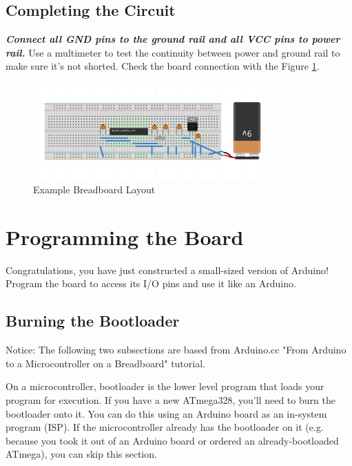 \documentclass{article}
\begin{document}
\subsection{Completing the Circuit}
\textbf{\emph{Connect all GND pins to the ground rail and all VCC pins to power rail.}} Use a multimeter to test the continuity between power and ground rail to make sure it's not shorted. Check the board connection with the Figure \ref{img:egBBL}.

\begin{figure}[!h]
    \center
    \includegraphics[width=0.8\textwidth,keepaspectratio]{egBBL}
    \caption{Example Breadboard Layout}
    \label{img:egBBL}
\end{figure}

\section{Programming the Board}
Congratulations, you have just constructed a small-sized version of Arduino! Program the board to access its I/O pins and use it like an Arduino. 
\subsection{Burning the Bootloader}
Notice: The following two subsections are based from Arduino.cc "From Arduino to a Microcontroller on a Breadboard" tutorial. \par
On a microcontroller, bootloader is the lower level program that loads your program for execution. If you have a new ATmega328, you'll need to burn the bootloader onto it. You can do this using an Arduino board as an in-system program (ISP). If the microcontroller already has the bootloader on it (e.g. because you took it out of an Arduino board or ordered an already-bootloaded ATmega), you can skip this section. \cite{arduino}
\end{document}
